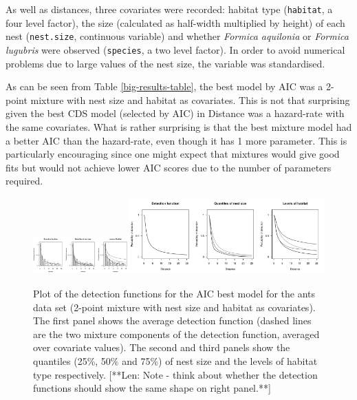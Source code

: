 \documentclass[useAMS,referee]{biom}
\begin{document}
As well as distances, three covariates were recorded: habitat type (\texttt{habitat}, a four level factor), the size (calculated as half-width multiplied by height) of each nest (\texttt{nest.size}, continuous variable) and whether \textit{Formica aquilonia} or \textit{Formica lugubris} were observed (\texttt{species}, a two level factor). In order to avoid numerical problems due to large values of the nest size, the variable was standardised.

As can be seen from Table \ref{big-results-table}, the best model by AIC was a 2-point mixture with nest size and habitat as covariates. This is not that surprising given the best CDS model (selected by AIC) in Distance was a hazard-rate with the same covariates. What is rather surprising is that the best mixture model had a better AIC than the hazard-rate, even though it has 1 more parameter. This is particularly encouraging since one might expect that mixtures would give good fits but would not achieve lower AIC scores due to the number of parameters required.

\begin{figure}
\centering
\includegraphics[width=0.3333\textwidth, trim=0 0 5.73228347in 0, clip=true]{analyses/ants-nesthab-1.pdf}\includegraphics[width=0.6666\textwidth, trim=2.86614173in 0 0 0, clip=true]{analyses/ants-nesthab-2.pdf}
\caption{Plot of the detection functions for the AIC best model for the ants data set (2-point mixture with nest size and habitat as covariates). The first panel shows the average detection function (dashed lines are the two mixture components of the detection function, averaged over covariate values). The second and third panels show the quantiles (25\%, 50\% and 75\%) of nest size and the levels of habitat type respectively.
[**Len: Note - think about whether the detection functions should show the same shape on right panel.**] }
\label{ants-nesthab}
\end{figure}
\end{document}

